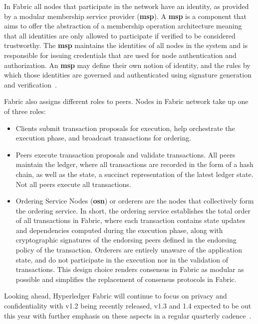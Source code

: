 In Fabric all nodes that participate in the network have an identity, as
provided by a modular membership service provider (\textbf{msp}).  A
\textbf{msp} is a component that aims to offer the abstraction of a membership
operation architecture meaning that all identities are only allowed to
participate if verified to be considered trustworthy.  The \textbf{msp}
maintains the identities of all nodes in the system and is responsible for
issuing credentials that are used for node authentication and authorization. An
\textbf{msp} may define their own notion of identity, and the rules by which
those identities are governed and authenticated using signature generation and
verification~\cite{HyperledgerFabricDocs2017}.

Fabric also assigns different roles to peers. Nodes in Fabric network take up
one of three roles:

\begin{itemize}
  \item Clients submit transaction proposals for execution, help orchestrate
    the execution phase, and broadcast transactions for ordering.

  \item Peers execute transaction proposals and validate transactions.  All
    peers maintain the ledger, where all transactions  are recorded in the form
    of a hash chain, as well as the state, a succinct representation of the
    latest ledger state. Not all peers execute all transactions.

  \item Ordering Service Nodes (\textbf{osn}) or orderers are the nodes that
    collectively form the ordering service. In short, the ordering service
    establishes the total order of all transactions in Fabric, where each
    transaction contains state updates and dependencies computed during the
    execution phase, along with cryptographic signatures of the endorsing peers
    defined in the endorsing policy of the transaction. Orderers are entirely
    unaware of the application state, and do not participate in the execution
    nor in the validation of transactions. This design choice renders consensus
    in Fabric as modular as possible and simplifies the replacement of
    consensus protocols in Fabric. 
\end{itemize}

Looking ahead, Hyperledger Fabric will continue to focus on privacy and
confidentiality with v1.2 being recently released, v1.3 and 1.4 expected to be
out this year with further emphasis on these aspects in a regular quarterly
cadence~\cite{hyperledgerRoadmap2018}.
